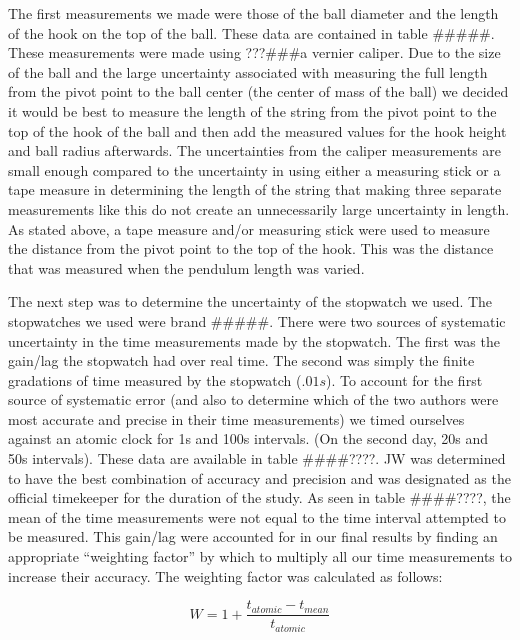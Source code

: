 \documentclass[iop]{emulateapj}
\def\fillin{\#\#\#\#????}
\begin{document}
The first measurements we made were those of the ball diameter and the length 
of the hook on the top of the ball.  These data are contained in table \#\#\#\#\#. 
These measurements were made using ???\#\#\#a vernier caliper.  Due to the size of 
the ball and the large uncertainty associated with measuring the full length 
from the pivot point to the ball center (the center of mass of the
ball) we decided it would be best to measure the length of the string from the
pivot point to the top of the hook of the ball and then add the measured values 
for the hook height and ball radius afterwards.  The uncertainties from the 
caliper measurements are small enough compared to the uncertainty in using 
either a measuring stick or a tape measure in determining the length of the
string that making three separate measurements like this do not create an 
unnecessarily large uncertainty in length.  As stated above, a tape measure 
and/or measuring stick were used to measure the distance from the pivot point
to the top of the hook.  This was the distance that was measured when the
pendulum length was varied.


The next step was to determine the uncertainty of the stopwatch we used.  The
stopwatches we used were brand \#\#\#\#\#.  There were two sources of systematic 
uncertainty in the time measurements made by the stopwatch.  The first was the 
gain/lag the stopwatch had over real time.  The second was simply the finite 
gradations of time measured by the stopwatch ($.01 s$).  To account for the 
first source of systematic error (and also to determine which of the two 
authors were most accurate and precise in their time measurements) we timed 
ourselves against an atomic clock for 1s and 100s intervals.  (On the second
day, 20s and 50s intervals).  These data are available in table \fillin.  JW 
was determined to have the best combination of accuracy and precision and was 
designated as the official timekeeper for the duration of the study.  As seen 
in table \fillin, the mean of the time measurements were not equal to the time 
interval attempted to be measured.  This gain/lag were accounted for in our 
final results by finding an appropriate ``weighting factor'' by which to 
multiply all our time measurements to increase their accuracy.  The weighting 
factor was calculated as follows:


\begin{equation}
\label{eq:timeweight}
W = 1 + \frac{t_{atomic}-t_{mean}}{t_{atomic}} 
\end{equation}
\end{document}
